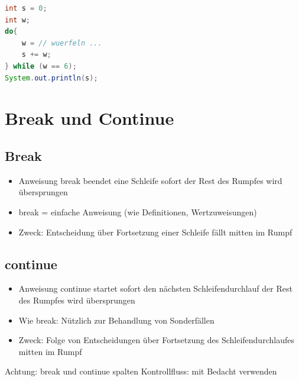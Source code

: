  \begin{lstlisting}[language=JAVA]
int s = 0;
int w;
do{
	w = // wuerfeln ...
	s += w;
} while (w == 6);
System.out.println(s);
 \end{lstlisting}
%
%
%
\section{Break und Continue}

\subsection{Break}
\begin{itemize}
\item Anweisung break beendet eine Schleife sofort der Rest des Rumpfes wird übersprungen
\item break = einfache Anweisung (wie Definitionen, Wertzuweisungen)
\item Zweck: Entscheidung über Fortsetzung einer Schleife fällt mitten im Rumpf
\end{itemize}

\subsection{continue}
\begin{itemize}
\item Anweisung continue startet sofort den nächsten Schleifendurchlauf der Rest des Rumpfes wird übersprungen
\item Wie break: Nützlich zur Behandlung von Sonderfällen
\item Zweck: Folge von Entscheidungen über Fortsetzung des Schleifendurchlaufes mitten im Rumpf
\end{itemize}	
Achtung: break und continue spalten Kontrollfluss: mit Bedacht
verwenden
%
%
%
